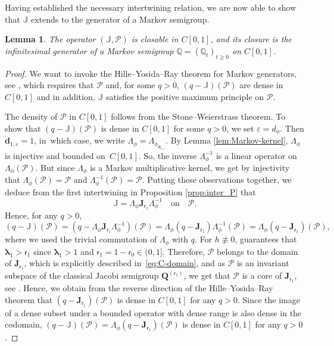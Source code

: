 \documentclass[10pt]{amsart}
\let\epsilon\varepsilon
\theoremstyle{plain}
\newtheorem{lemma}[theorem]{Lemma}
\theoremstyle{definition}
\newcommand{\Poly}{\mathscr{P}}
\newcommand{\J}{\mathds{Q}}
\newcommand{\calJ}{\mathds{J}}
\newcommand{\calJd}{\mathbf{J}}
\newcommand{\dz}{{\bm{d}}_{1,\epsilon}}
\newcommand{\lam}{{\bm{\lambda}_1}}
\newcommand{\tet}{{\mathsf{r}_0}}
\newcommand{\vat}{{\mathsf{r}_1}}
\newcommand{\Q}[1][\mo]{\mathbf{Q}^{({#1})}}
\let\mo\mu
\begin{document}
Having established the necessary intertwining relation, we are now able to show that $\calJ$ extends to the generator of a Markov semigroup.

\begin{lemma}
\label{lem:feller}
The operator $(\calJ ,\Poly)$ is closable in $C[0,1]$, and its closure is the infinitesimal generator of a Markov semigroup $\J = (\J_t)_{t \geq 0}$ on $C[0,1]$.
\end{lemma}

\begin{proof}
We want to invoke the Hille--Yosida--Ray theorem for Markov generators, see \cite[Th.\,1.30]{Levy-Matters-III}, which requires that $\Poly$ and, for some $q>0$, $(q-\calJ)(\Poly)$ are dense in $C[0,1]$ and in addition, $\calJ$ satisfies the positive maximum principle on $\Poly$.

The density of $\Poly$ in $C[0,1]$ follows from the Stone--Weierstrass theorem.
To show that $(q-\calJ)(\Poly)$ is dense in $C[0,1]$ for some $q >0$, we set $\epsilon = d_\phi$. Then
$\dz = 1$, in~which case, we write $\Lambda_{\phi} = \Lambda_{\phi_{\dz}}$.
By Lemma \ref{lem:Markov-kernel}, $\Lambda_{\phi}$ is injective and bounded on~$C[0,1]$. So, the inverse $\Lambda_{\phi}^{-1}$ is a linear operator on $\Lambda_{\phi}(\Poly)$. But since $\Lambda_\phi$ is a Markov multiplicative kernel, we get by injectivity that $\Lambda_\phi(\Poly) = \Poly$ and $\Lambda_\phi^{-1}(\Poly) = \Poly$.
Putting these observations together, we deduce from the first intertwining in Proposition \ref{prop:inter_P} that\vspace*{-3pt}
\begin{equation*}
\calJ =\Lambda_{\phi}\calJd_{\vat} \Lambda_{\phi}^{-1} \quad \text{on} \quad \Poly.
\end{equation*}
Hence, for any $q >0$,\vspace*{-3pt}
\begin{equation*}
(q - \calJ)(\Poly) = (q - \Lambda_\phi \calJd_{\vat} \Lambda_\phi^{-1})(\Poly) = \Lambda_\phi(q-\calJd_{\vat})\Lambda_\phi^{-1}(\Poly) = \Lambda_\phi(q-\calJd_{\vat})(\Poly),
\end{equation*}
where we used the trivial commutation of $\Lambda_\phi$ with $q$. For $h \not\equiv 0$,  guarantees that $\lam > \vat$ since $\lam > 1$ and $\vat = 1-\tet \in (0,1]$. Therefore, $\Poly$ belongs to the domain of $\calJd_{\vat}$, which is explicitly described in~\eqref{eq:C-domain}, and as $\Poly$ is an invariant subspace of the classical Jacobi semigroup $\Q[\vat]$, we get that $\Poly$ is a core of $\calJd_{\vat}$, see \cite[Lem.\,1.34]{Levy-Matters-III}. Hence, we obtain from the
reverse direction of the Hille--Yosida--Ray theorem that $(q-\calJd_{\vat})(\Poly)$ is dense in $C[0,1]$ for any $q > 0$. Since the image of a dense subset under a bounded operator with dense range is also dense in the codomain,
$(q - \calJ)(\Poly) = \Lambda_\phi(q-\calJd_{\vat})(\Poly)$ is dense in $C[0,1]$ for any $q > 0$.


\end{proof}
\end{document}
